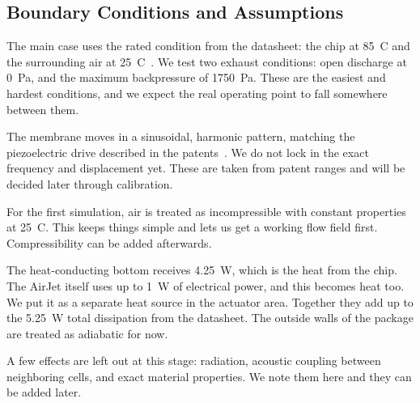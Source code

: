 \documentclass[11pt]{article}
\begin{document}
\subsection{Boundary Conditions and Assumptions}

The main case uses the rated condition from the datasheet: the chip at
85~\textdegree{}C and the surrounding air at 25~\textdegree{}C~\cite{frore_datasheet}.
We test two exhaust conditions: open discharge at 0~Pa, and the maximum
backpressure of 1750~Pa. These are the easiest and hardest conditions,
and we expect the real operating point to fall somewhere between them.

The membrane moves in a sinusoidal, harmonic pattern, matching the
piezoelectric drive described in the patents~\cite{us12137540b2}. We
do not lock in the exact frequency and displacement yet. These are
taken from patent ranges and will be decided later through calibration.

For the first simulation, air is treated as incompressible with
constant properties at 25~\textdegree{}C. This keeps things simple and
lets us get a working flow field first. Compressibility can be added
afterwards.

The heat-conducting bottom receives 4.25~W, which is the heat from the
chip. The AirJet itself uses up to 1~W of electrical power, and this
becomes heat too. We put it as a separate heat source in the actuator
area. Together they add up to the 5.25~W total dissipation from the
datasheet. The outside walls of the package are treated as adiabatic
for now.

A few effects are left out at this stage: radiation, acoustic coupling
between neighboring cells, and exact material properties. We note them
here and they can be added later.

\printbibliography
\end{document}
